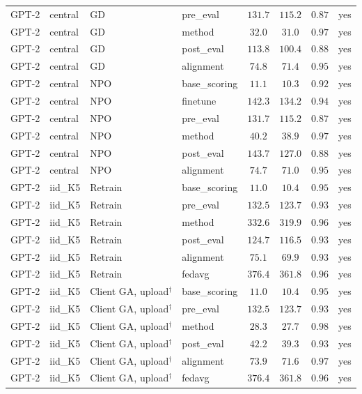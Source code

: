 {\begin{longtable}{@{\extracolsep{\fill}}llllcccc@{}}
GPT-2 & central & GD & pre\_eval & $131.7$ & $115.2$ & $0.87$ & yes \\
GPT-2 & central & GD & method & $32.0$ & $31.0$ & $0.97$ & yes \\
GPT-2 & central & GD & post\_eval & $113.8$ & $100.4$ & $0.88$ & yes \\
GPT-2 & central & GD & alignment & $74.8$ & $71.4$ & $0.95$ & yes \\
GPT-2 & central & NPO & base\_scoring & $11.1$ & $10.3$ & $0.92$ & yes \\
GPT-2 & central & NPO & finetune & $142.3$ & $134.2$ & $0.94$ & yes \\
GPT-2 & central & NPO & pre\_eval & $131.7$ & $115.2$ & $0.87$ & yes \\
GPT-2 & central & NPO & method & $40.2$ & $38.9$ & $0.97$ & yes \\
GPT-2 & central & NPO & post\_eval & $143.7$ & $127.0$ & $0.88$ & yes \\
GPT-2 & central & NPO & alignment & $74.7$ & $71.0$ & $0.95$ & yes \\
GPT-2 & iid\_K5 & Retrain & base\_scoring & $11.0$ & $10.4$ & $0.95$ & yes \\
GPT-2 & iid\_K5 & Retrain & pre\_eval & $132.5$ & $123.7$ & $0.93$ & yes \\
GPT-2 & iid\_K5 & Retrain & method & $332.6$ & $319.9$ & $0.96$ & yes \\
GPT-2 & iid\_K5 & Retrain & post\_eval & $124.7$ & $116.5$ & $0.93$ & yes \\
GPT-2 & iid\_K5 & Retrain & alignment & $75.1$ & $69.9$ & $0.93$ & yes \\
GPT-2 & iid\_K5 & Retrain & fedavg & $376.4$ & $361.8$ & $0.96$ & yes \\
GPT-2 & iid\_K5 & Client GA, upload$^{\dagger}$ & base\_scoring & $11.0$ & $10.4$ & $0.95$ & yes \\
GPT-2 & iid\_K5 & Client GA, upload$^{\dagger}$ & pre\_eval & $132.5$ & $123.7$ & $0.93$ & yes \\
GPT-2 & iid\_K5 & Client GA, upload$^{\dagger}$ & method & $28.3$ & $27.7$ & $0.98$ & yes \\
GPT-2 & iid\_K5 & Client GA, upload$^{\dagger}$ & post\_eval & $42.2$ & $39.3$ & $0.93$ & yes \\
GPT-2 & iid\_K5 & Client GA, upload$^{\dagger}$ & alignment & $73.9$ & $71.6$ & $0.97$ & yes \\
GPT-2 & iid\_K5 & Client GA, upload$^{\dagger}$ & fedavg & $376.4$ & $361.8$ & $0.96$ & yes \\

\end{longtable}}
